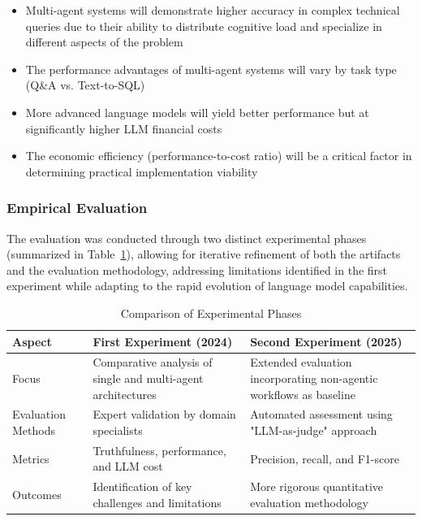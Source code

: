         \begin{tcolorbox}[colback=gray!10, colframe=gray!40, title=Key Research Conjectures]
            \begin{itemize}
            \item Multi-agent systems will demonstrate higher accuracy in complex technical queries due to their ability to distribute cognitive load and specialize in different aspects of the problem
            \item The performance advantages of multi-agent systems will vary by task type (Q\&A vs. Text-to-SQL)
            \item More advanced language models will yield better performance but at significantly higher LLM financial costs
            \item The economic efficiency (performance-to-cost ratio) will be a critical factor in determining practical implementation viability
            \end{itemize}
        \end{tcolorbox}
        
        \subsubsection{Empirical Evaluation}
        
        The evaluation was conducted through two distinct experimental phases (summarized in Table~\ref{tab:experiments}), allowing for iterative refinement of both the artifacts and the evaluation methodology, addressing limitations identified in the first experiment while adapting to the rapid evolution of language model capabilities.
        
        \begin{table}[h]
        \centering
        \caption{Comparison of Experimental Phases}
        \begin{tabular}{|p{}|p{}|p{}|}
        \hline
        \textbf{Aspect} & \textbf{First Experiment (2024)} & \textbf{Second Experiment (2025)} \\
        \hline
        Focus & Comparative analysis of single and multi-agent architectures & Extended evaluation incorporating non-agentic workflows as baseline \\
        \hline
        Evaluation Methods & Expert validation by domain specialists & Automated assessment using "LLM-as-judge" approach \\
        \hline
        Metrics & Truthfulness, performance, and LLM cost & Precision, recall, and F1-score \\
        \hline
        Outcomes & Identification of key challenges and limitations & More rigorous quantitative evaluation methodology \\
        \hline
        \end{tabular}
        \label{tab:experiments}
        \end{table}

